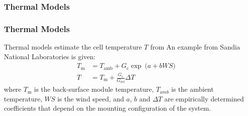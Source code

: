\begin{frame}
\frametitle{Thermal Models}
    \frametitle{Thermal Models}
    Thermal models estimate the cell temperature \(T\) from 
    An example from Sandia National Laboratories is given:
    \vspace*{0.5cm}
    \begin{align}
        T_{\text{m}} &= T_{\text{amb}} + G_{\text{c}} \exp \: \bigl(a + b \mathit{WS} \bigr) \nonumber \\
        T &= T_{\text{m}} + \frac{G_{\text{c}}}{G_{\text{ref}}} \Delta T \nonumber
    \end{align}
    where \(T_{\text{m}}\) is the back-surface module temperature, \(T_{amb}\) is the ambient temperature,
    \(WS\) is the wind speed, and \(a\), \(b\) and \(\Delta T\) are empirically determined coefficients
    that depend on the mounting configuration of the system.
\end{frame}
